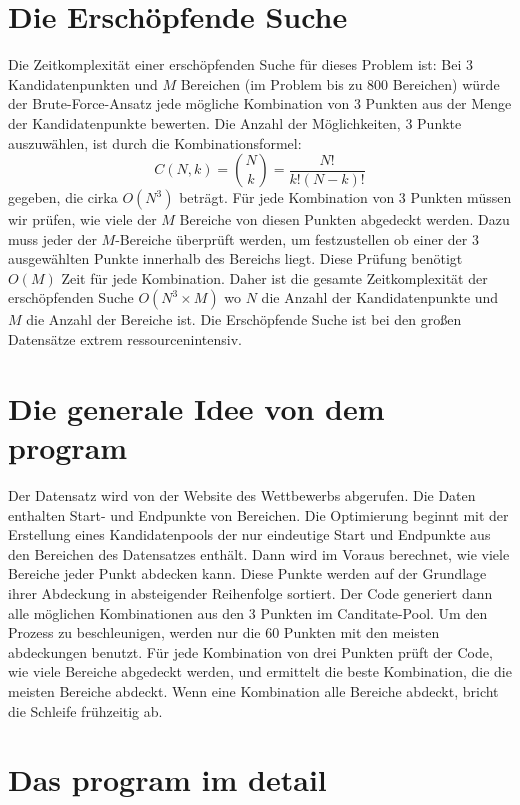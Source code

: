 \section{Die Erschöpfende Suche}

Die Zeitkomplexität einer erschöpfenden Suche für dieses Problem ist: Bei \(3\) Kandidatenpunkten und \(M\) Bereichen (im Problem bis zu 800 Bereichen) würde der Brute-Force-Ansatz jede mögliche Kombination von 3 Punkten aus der Menge der Kandidatenpunkte bewerten. Die Anzahl der Möglichkeiten, 3 Punkte auszuwählen, ist durch die Kombinationsformel: 
\[C(N, k) = \binom{N}{k} = \frac{N!}{k!(N-k)!}\]
gegeben, die cirka \(O(N^3)\) beträgt. Für jede Kombination von 3 Punkten müssen wir prüfen, wie viele der \(M\) Bereiche von diesen Punkten abgedeckt werden. Dazu muss jeder der \(M\)-Bereiche überprüft werden, um festzustellen ob einer der 3  ausgewählten Punkte innerhalb des Bereichs liegt. Diese Prüfung benötigt \(O(M)\) Zeit für jede Kombination. Daher ist die gesamte Zeitkomplexität der erschöpfenden Suche \(O(N^3 \times M)\) wo \(N\) die Anzahl der Kandidatenpunkte und \(M\) die Anzahl der Bereiche ist. Die Erschöpfende Suche ist bei den großen Datensätze extrem ressourcenintensiv.  


\section{Die generale Idee von dem program}

Der Datensatz wird von der Website des Wettbewerbs abgerufen. Die Daten enthalten Start- und Endpunkte von Bereichen. Die Optimierung beginnt mit der Erstellung eines Kandidatenpools der nur eindeutige Start und Endpunkte aus den Bereichen des Datensatzes enthält. Dann wird im Voraus berechnet, wie viele Bereiche jeder Punkt abdecken kann. Diese Punkte werden auf der Grundlage ihrer Abdeckung in absteigender Reihenfolge sortiert. Der Code generiert dann alle möglichen Kombinationen aus den 3 Punkten im Canditate-Pool. Um den Prozess zu beschleunigen, werden nur die 60 Punkten mit den meisten abdeckungen benutzt. Für jede Kombination von drei Punkten prüft der Code, wie viele Bereiche abgedeckt werden, und ermittelt die beste Kombination, die die meisten Bereiche abdeckt. Wenn eine Kombination alle Bereiche abdeckt, bricht die Schleife frühzeitig ab. 


\section{Das program im detail}

